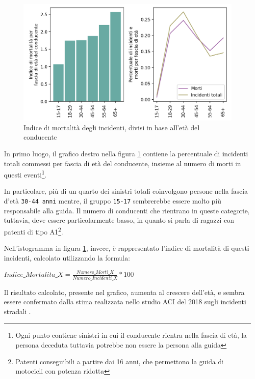 \documentclass[a4paper,12pt]{report}
\newcommand{\columnstyle}[1]{\texttt{#1}}
\begin{document}
\begin{figure}
    \includegraphics[width=\linewidth]{../src/incidenti/incidenti_senza_coords/mortalita/indice_mortalita_eta.png}
    \caption{Indice di mortalità degli incidenti, divisi in base all'età del conducente}
    \label{fig:indice-mortalita-eta}
\end{figure}

In primo luogo, il grafico destro nella figura \ref{fig:indice-mortalita-eta} contiene 
la percentuale di incidenti totali commessi per fascia di età del conducente, insieme 
al numero di morti in questi eventi\footnote{Ogni punto contiene sinistri in 
cui il conducente rientra nella fascia di età, la persona deceduta tuttavia potrebbe non 
essere la persona alla guida}. 

In particolare, più di un quarto dei sinistri totali coinvolgono persone nella 
fascia d'età \columnstyle{30-44 anni} mentre, il gruppo \columnstyle{15-17} sembrerebbe 
essere molto più responsabile alla guida. Il numero di conducenti che rientrano 
in queste categorie, tuttavia, deve essere particolarmente basso, in quanto si 
parla di ragazzi con patenti di tipo A1\footnote{Patenti conseguibili a partire dai 16 anni, 
che permettono la guida di motocicli con potenza ridotta}. 

Nell'istogramma in figura \ref{fig:indice-mortalita-eta}, invece, 
è rappresentato l'indice di mortalità di questi incidenti, 
calcolato utilizzando la formula: 

\begin{center}
    $Indice\_Mortalita\_X = \displaystyle \frac{Numero\_Morti\_X}{Numero\_Incidenti\_X} * 100$ 
\end{center}

Il risultato calcolato, presente nel grafico, aumenta al crescere dell'età, 
e sembra essere confermato dalla stima realizzata nello studio 
ACI del 2018 sugli incidenti stradali \cite{ACI:3}. 
\end{document}
